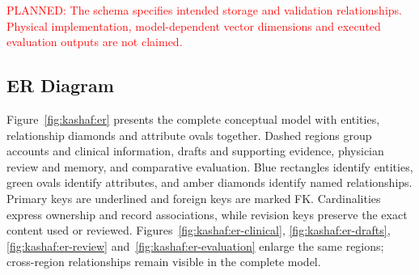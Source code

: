 \textcolor{red}{PLANNED: The schema specifies intended storage and validation relationships. Physical implementation, model-dependent vector dimensions and executed evaluation outputs are not claimed.}

\subsection{ER Diagram}
Figure~\ref{fig:kashaf:er} presents the complete conceptual model with entities, relationship diamonds and attribute ovals together. Dashed regions group accounts and clinical information, drafts and supporting evidence, physician review and memory, and comparative evaluation. Blue rectangles identify entities, green ovals identify attributes, and amber diamonds identify named relationships. Primary keys are underlined and foreign keys are marked FK. Cardinalities express ownership and record associations, while revision keys preserve the exact content used or reviewed. Figures~\ref{fig:kashaf:er-clinical}, \ref{fig:kashaf:er-drafts}, \ref{fig:kashaf:er-review} and~\ref{fig:kashaf:er-evaluation} enlarge the same regions; cross-region relationships remain visible in the complete model.

